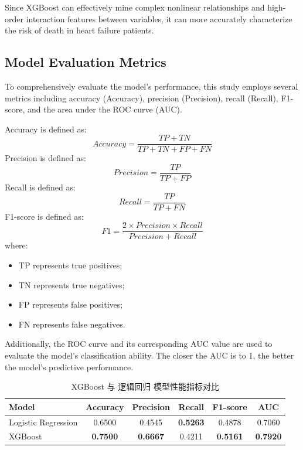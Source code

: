 \documentclass[11pt,a4paper]{article}
\begin{document}
Since XGBoost can effectively mine complex nonlinear relationships and high-order interaction features between variables, it can more accurately characterize the risk of death in heart failure patients.

\subsection{Model Evaluation Metrics}

To comprehensively evaluate the model's performance, this study employs several metrics including accuracy (Accuracy), precision (Precision), recall (Recall), F1-score, and the area under the ROC curve (AUC).

Accuracy is defined as:
\begin{equation}
Accuracy=
\frac{TP+TN}
{TP+TN+FP+FN}
\end{equation}
Precision is defined as:
\begin{equation}
Precision=
\frac{TP}
{TP+FP}
\end{equation}
Recall is defined as:   
\begin{equation}
Recall=
\frac{TP}
{TP+FN}
\end{equation}
F1-score is defined as:
\begin{equation}
F1=
\frac{2\times Precision \times Recall}
{Precision+Recall}
\end{equation}  
where:
\begin{itemize}
\item TP represents true positives;
\item TN represents true negatives;
\item FP represents false positives;
\item FN represents false negatives.
\end{itemize}
Additionally, the ROC curve and its corresponding AUC value are used to evaluate the model's classification ability. The closer the AUC is to 1, the better the model's predictive performance.
\begin{table}[htbp]
  \centering
  \small
  \caption{XGBoost 与 逻辑回归 模型性能指标对比}
  \label{tab:model_comparison}
  \begin{tabular}{lccccc}
    \toprule
    Model &  Accuracy &  Precision &  Recall & F1-score & AUC \\
    \midrule
   Logistic Regression & 0.6500 & 0.4545 & \textbf{0.5263} & 0.4878 & 0.7060 \\
    XGBoost                      & \textbf{0.7500} & \textbf{0.6667} & 0.4211 & \textbf{0.5161} & \textbf{0.7920} \\
    \bottomrule
  \end{tabular}
\end{table}
\end{document}
